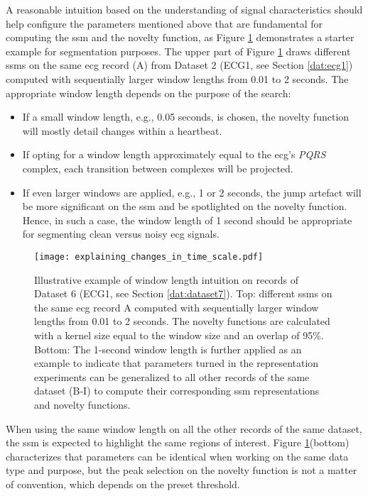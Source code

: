A reasonable intuition based on the understanding of signal characteristics should help configure the parameters mentioned above that are fundamental for computing the \gls{ssm} and the novelty function, as Figure \ref{fig:intuition} demonstrates a starter example for segmentation purposes. The upper part of Figure \ref{fig:intuition} draws different \gls{ssm}s on the same \gls{ecg} record (A) from Dataset 2 (ECG1, see Section \ref{dat:ecg1}) computed with sequentially larger window lengths from 0.01 to 2 seconds.
The appropriate window length depends on the purpose of the search:

\begin{itemize}
    \item If a small window length, e.g., 0.05 seconds, is chosen, the novelty function will mostly detail changes within a heartbeat.
    \item If opting for a window length approximately equal to the \gls{ecg}'s \textit{PQRS} complex, each transition between complexes will be projected.
    \item If even larger windows are applied, e.g., 1 or 2 seconds, the jump artefact will be more significant on the \gls{ssm} and be spotlighted on the novelty function. Hence, in such a case, the window length of 1 second should be appropriate for segmenting clean versus noisy \gls{ecg} signals.
\end{itemize}

\begin{figure}
    \centering
    \texttt{[image: explaining\_changes\_in\_time\_scale.pdf]}
    \caption{Illustrative example of window length intuition on records of Dataset 6 (ECG1, see Section \ref{dat:dataset7}). Top: different \gls{ssm}s on the same \gls{ecg} record A computed with sequentially larger window lengths from 0.01 to 2 seconds. The novelty functions are calculated with a kernel size equal to the window size and an overlap of 95\%. Bottom: The 1-second window length is further applied as an example to indicate that parameters turned in the representation experiments can be generalized to all other records of the same dataset (B-I) to compute their corresponding \gls{ssm} representations and novelty functions.}
    \label{fig:intuition}
\end{figure}

When using the same window length on all the other records of the same dataset, the \gls{ssm} is expected to highlight the same regions of interest. Figure \ref{fig:intuition}(bottom) characterizes that parameters can be identical when working on the same data type and purpose, but the peak selection on the novelty function is not a matter of convention, which depends on the preset threshold.

